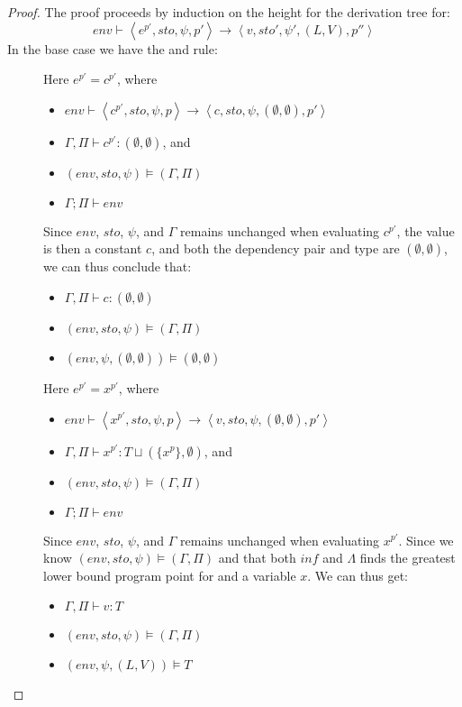 \documentclass[../../master.tex]{subfiles}
\begin{document}
\begin{proof}
	The proof proceeds by induction on the height for the derivation tree for:
	$$env\vdash\left\langle e^{p'},sto,\psi,p'\right\rangle\rightarrow\left\langle v,sto',\psi',(L,V),p''\right\rangle$$
	In the base case we have the  and  rule:
	\begin{description}
		\item[] Here $e^{p'}=c^{p'}$, where
			\begin{itemize}
				\item $env\vdash\left\langle c^{p'},sto,\psi,p\right\rangle\rightarrow\left\langle c,sto,\psi,(\emptyset,\emptyset),p'\right\rangle$
				\item $\Gamma,\Pi\vdash c^{p'}:(\emptyset,\emptyset)$, and
				\item $(env,sto,\psi)\models(\Gamma,\Pi)$
				\item $\Gamma;\Pi\vdash env$
			\end{itemize}
			Since $env$, $sto$, $\psi$, and $\Gamma$ remains unchanged when evaluating $c^{p'}$, the value is then a constant $c$, and both the dependency pair and type are $(\emptyset,\emptyset)$, we can thus conclude that:
			\begin{itemize}
				\item $\Gamma,\Pi\vdash c : (\emptyset,\emptyset)$
				\item $(env,sto,\psi)\models(\Gamma,\Pi)$
				\item $(env,\psi,(\emptyset,\emptyset))\models(\emptyset,\emptyset)$
			\end{itemize}

		\item[] Here $e^{p'}=x^{p'}$, where
			\begin{itemize}
				\item $env\vdash\left\langle x^{p'},sto,\psi,p\right\rangle\rightarrow\left\langle v,sto,\psi,(\emptyset,\emptyset),p'\right\rangle$
				\item $\Gamma,\Pi\vdash x^{p'}:T\sqcup (\{x^p\},\emptyset)$, and 
				\item $(env,sto,\psi)\models(\Gamma,\Pi)$
				\item $\Gamma;\Pi\vdash env$
			\end{itemize}
			Since $env$, $sto$, $\psi$, and $\Gamma$ remains unchanged when evaluating $x^{p'}$.
			Since we know $(env,sto,\psi)\models(\Gamma,\Pi)$ and that both $inf$ and $\Lambda$ finds the greatest lower bound program point for and a variable $x$.
			We can thus get:
			\begin{itemize}
				\item $\Gamma,\Pi\vdash v:T$
				\item $(env,sto,\psi)\models(\Gamma,\Pi)$
				\item $(env,\psi,(L,V))\models T$
			\end{itemize}
	\end{description}


\end{proof}
\end{document}
